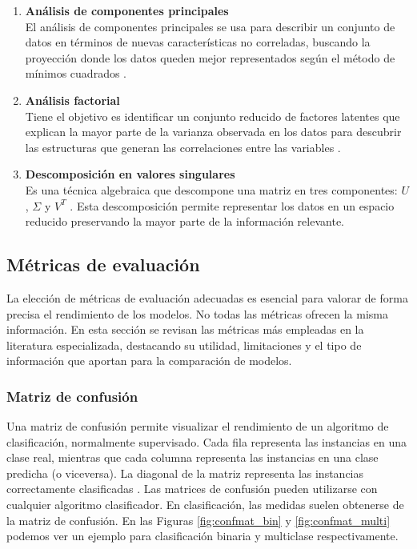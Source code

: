\begin{enumerate}
	\item \textbf{Análisis de componentes principales} \\
		El análisis de componentes principales se usa para describir un conjunto de datos en términos de nuevas características no correladas, buscando la proyección donde los datos queden mejor representados según el método de mínimos cuadrados \cite{pca}.

	\item \textbf{Análisis factorial} \\
		Tiene el objetivo es identificar un conjunto reducido de factores latentes que explican la mayor parte de la varianza observada en los datos para descubrir las estructuras que generan las correlaciones entre las variables \cite{fa}.

	\item \textbf{Descomposición en valores singulares} \\
		Es una técnica algebraica que descompone una matriz en tres componentes: $U$, $\Sigma$ y $V^T$ \cite{dvs}. Esta descomposición permite representar los datos en un espacio reducido preservando la mayor parte de la información relevante.
\end{enumerate}

\subsection{Métricas de evaluación}
\label{subsec:2_metricas}

La elección de métricas de evaluación adecuadas es esencial para valorar de forma precisa el rendimiento de los modelos. No todas las métricas ofrecen la misma información. En esta sección se revisan las métricas más empleadas en la literatura especializada, destacando su utilidad, limitaciones y el tipo de información que aportan para la comparación de modelos.

\newpage
\subsubsection{Matriz de confusión}
\label{subsubsec:matrix}

Una matriz de confusión permite visualizar el rendimiento de un algoritmo de clasificación, normalmente supervisado. Cada fila representa las instancias en una clase real, mientras que cada columna representa las instancias en una clase predicha (o viceversa). La diagonal de la matriz representa las instancias correctamente clasificadas \cite{confmat}. Las matrices de confusión pueden utilizarse con cualquier algoritmo clasificador. En clasificación, las medidas suelen obtenerse de la matriz de confusión. En las Figuras \ref{fig:confmat_bin} y \ref{fig:confmat_multi} podemos ver un ejemplo para clasificación binaria y multiclase respectivamente.

